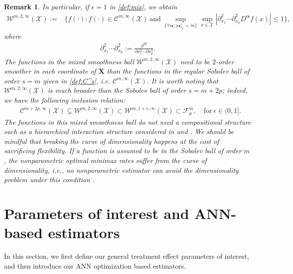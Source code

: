 \documentclass[11pt]{article}
\def\bs{\boldsymbol}
\newtheorem{rk}{Remark}
\numberwithin{equation}{section}
\begin{document}
\begin{rk}
In particular, if $\epsilon=1$ in \eqref{def:mix}, we  obtain
\begin{align*}
	\mathcal{W}^{m,2,\infty}(\mathcal{X}):=&\bigg\{f(\cdot):f(\cdot)\in\mathcal{C}^{m,\infty}(\mathcal{X}) \ \text{and} \ \sup_{\{\forall \boldsymbol{\alpha}:  |\boldsymbol{\alpha}|_{1}= m\}}\sup_{x\in \mathcal{X}}\left|\partial^2_{x_1}\cdots \partial^2_{x_p}D^{\boldsymbol{\alpha}}f(x)\right|\leq 1\bigg\},
\end{align*}
where
\begin{align*}
\partial^2_{x_1}\cdots \partial^2_{x_p}:=\frac{\partial^{2p}}{\partial x^2_1\cdots \partial x^2_p}.
\end{align*}
 The functions in the mixed smoothness ball $\mathcal{W}^{m,2,\infty}(\mathcal{X})$ need to be $2$-order smoother in each coordinate of $\bs{X}$ than the functions in the regular Sobolev ball of order $s=m$ given in \eqref{def:C^s}, i.e.  $\mathcal{C}^{m,\infty}(\mathcal{X})$. It is worth noting that  $\mathcal{W}^{m,2,\infty}(\mathcal{X})$  is much broader than the Sobolev ball of order $s=m+2p$; indeed, we have the following inclusion relation:
\begin{align*}
	&\mathcal{C}^{m+2p,\infty}(\mathcal{X})\subsetneq \mathcal{W}^{m,2,\infty}(\mathcal{X})\subset \mathcal{W}^{m,1+\epsilon,\infty}(\mathcal{X}) \subset \mathcal{F}^m_p, \quad \text{for} \ \epsilon\in(0,1].
\end{align*}
The functions in this mixed smoothness ball do not need a compositional structure such as a hierarchical interaction structure considered in \cite{bauer2019deep} and \cite{Schmidt2020}. We should be mindful that breaking the curse of dimensionality happens at the cost of
sacrificing flexibility. If a function is assumed to be in the Sobolev ball of order $m$, the nonparametric optimal minimax rates suffer from the curse of dimensionality, i.e., no nonparametric estimator can avoid the dimensionality problem under this condition \citep{Schmidt2020}.


\end{rk}


\section{Parameters of interest and ANN-based estimators}\label{sec:framework}
In this section, we first define our general treatment effect parameters of interest, and then introduce our ANN optimization based estimators.
\end{document}
